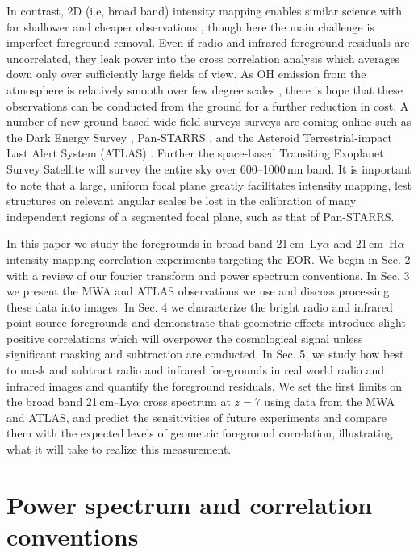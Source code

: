 \documentclass{emulateapj}
\begin{document}
In contrast, 2D (i.e, broad band) intensity mapping enables similar science with far shallower and cheaper observations \citep{StarsAndReionization,mao14}, though here the main challenge is imperfect foreground removal. Even if radio and infrared foreground residuals are uncorrelated, they leak power into the cross correlation analysis which averages down only over sufficiently large fields of view. As OH emission from the atmosphere is relatively smooth over few degree scales \citep{high10}, there is hope that these observations can be conducted from the ground for a further reduction in cost. A number of new ground-based wide field surveys surveys are coming online such as the Dark Energy Survey \citep{des16}, Pan-STARRS \citep{tonry12}, and the Asteroid Terrestrial-impact Last Alert System (ATLAS) \citep{tonry11}. Further the space-based  Transiting Exoplanet Survey Satellite \citep{ricker14} will survey the entire sky over 600--1000\,nm band. It is important to note that a large, uniform focal plane greatly facilitates intensity mapping, lest structures on relevant angular scales be lost in the calibration of many independent regions of a segmented focal plane, such as that of Pan-STARRS. 

In this paper we study the foregrounds in broad band 21\,cm--Ly$\alpha$ and 21\,cm--H$\alpha$ intensity mapping correlation experiments targeting the EOR. We begin in Sec. 2 with a review of our fourier transform and power spectrum conventions.
  In Sec. 3 we present the MWA and ATLAS observations we use and discuss processing these data into images. 
   In Sec. 4 we characterize the bright radio and infrared point source foregrounds and 
   demonstrate that geometric effects introduce slight positive correlations which will overpower the cosmological signal
   unless significant masking and subtraction are conducted. 
   In Sec. 5, we study how best to mask and subtract radio and infrared foregrounds in real world radio and infrared images and 
   quantify the foreground residuals. We set the first limits 
   on the broad band 21\,cm--Ly$\alpha$ cross spectrum at $z=7$ using data from the MWA
     and ATLAS, and predict the sensitivities of future experiments and compare them with the expected levels of geometric foreground correlation, 
     illustrating what it will take to realize this measurement.

\section{Power spectrum and correlation conventions}
\label{sec:pspecconventions}
\end{document}
